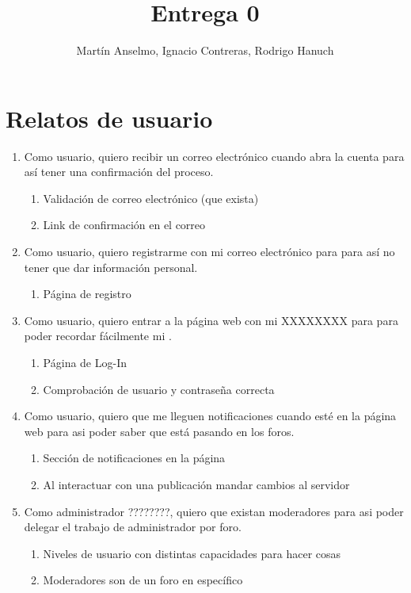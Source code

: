 \documentclass[12pt, letterpaper, notitlepage]{article}
\title{\textbf{Entrega 0}}
\author{Martín Anselmo, Ignacio Contreras, Rodrigo Hanuch}
\begin{document}
\clearpage\maketitle
\thispagestyle{empty}

\newpage

\section*{Relatos de usuario}
\newcommand{\story}[3]{Como {#1}, quiero {#2} para {#3}.}

\begin{enumerate}

	\item \story{usuario}{recibir un correo electrónico cuando abra la cuenta}	
		{así tener una confirmación del proceso}
		\begin{enumerate}
			\item Validación de correo electrónico (que exista)
			\item Link de confirmación en el correo		
		\end{enumerate}
		
	\item \story{usuario}{registrarme con mi correo electrónico}{para así no tener que 
		dar información personal}
		\begin{enumerate}
			\item Página de registro
		\end{enumerate}
		
	\item \story{usuario}{entrar a la página web con mi XXXXXXXX}{para poder recordar
		fácilmente mi \say{log-in}}
		\begin{enumerate}
			\item Página de Log-In
			\item Comprobación de usuario y contraseña correcta
		\end{enumerate}
		
	\item \story{usuario}{que me lleguen notificaciones cuando esté en la página web}		
		{asi poder saber que está pasando en los foros}
		\begin{enumerate}
			\item Sección de notificaciones en la página
			\item Al interactuar con una publicación mandar cambios al servidor
		\end{enumerate}
		
	\item \story{administrador ????????}{que existan moderadores}{asi poder delegar el 
		trabajo de administrador por foro}
		\begin{enumerate}
			\item Niveles de usuario con distintas capacidades para hacer cosas
			\item Moderadores son de un foro en específico
		\end{enumerate}
		

\end{enumerate}
\end{document}
